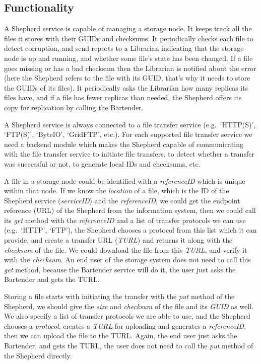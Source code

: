 \documentclass{book}
\begin{document}
\subsection{Functionality} %

A Shepherd service is capable of managing a storage node. It keeps track all the files it stores with their GUIDs and checksums. It periodically checks each file to detect corruption, and send reports to a Librarian indicating that the storage node is up and running, and whether some file's state has been changed. If a file goes missing or has a bad checksum then the Librarian is notified about the error (here the Shepherd refers to the file with its GUID, that's why it needs to store the GUIDs of its files). It periodically asks the Librarian how many replicas its files have, and if a file has fewer replicas than needed, the Shepherd offers its copy for replication by calling the Bartender.

A Shepherd service is always connected to a file transfer service (e.g.~`HTTP(S)', `FTP(S)', `ByteIO', `GridFTP', etc.). For each supported file transfer service we need a backend module which makes the Shepherd capable of communicating with the file transfer service to initiate file transfers, to detect whether a transfer was successful or not, to generate local IDs and checksums, etc.

A file in a storage node could be identified with a \emph{referenceID} which is unique within that node. If we know the \emph{location} of a file, which is the ID of the Shepherd service (\emph{serviceID}) and the \emph{referenceID}, we could get the endpoint reference (URL) of the Shepherd from the information system, then we could call its \emph{get} method with the \emph{referenceID} and a list of transfer protocols we can use (e.g.~`HTTP', `FTP'), the Shepherd chooses a protocol from this list which it can provide, and create a transfer URL (\emph{TURL}) and returns it along with the \emph{checksum} of the file. We could download the file from this \emph{TURL}, and verify it with the \emph{checksum}. An end user of the storage system does not need to call this \emph{get} method, because the Bartender service will do it, the user just asks the Bartender and gets the TURL.

Storing a file starts with initiating the transfer with the \emph{put} method of the Shepherd, we should give the \emph{size} and \emph{checksum} of the file and its \emph{GUID} as well. We also specify a list of transfer protocols we are able to use, and the Shepherd chooses a \emph{protocol}, creates a \emph{TURL} for uploading and generates a \emph{referenceID}, then we can upload the file to the TURL. Again, the end user just asks the Bartender, and gets the TURL, the user does not need to call the \emph{put} method of the Shepherd directly.
\end{document}
